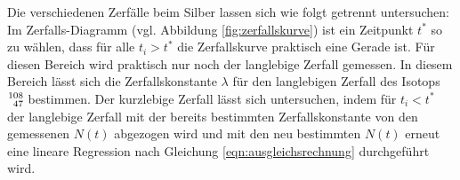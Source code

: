 Die verschiedenen Zerfälle beim Silber lassen sich wie folgt getrennt untersuchen:
Im Zerfalls-Diagramm (vgl. Abbildung \ref{fig:zerfallskurve}) ist ein Zeitpunkt $t^{*}$ so zu wählen, dass für alle $t_i>t^{*}$ die Zerfallskurve praktisch eine Gerade ist.
Für diesen Bereich wird praktisch nur noch der langlebige Zerfall gemessen.
In diesem Bereich lässt sich die Zerfallskonstante $\lambda$ für den langlebigen Zerfall des Isotops $\ce{^{108}_47}$ bestimmen.
Der kurzlebige Zerfall lässt sich untersuchen, indem für $t_i<t^{*}$ der langlebige Zerfall mit der bereits bestimmten Zerfallskonstante von den gemessenen $N(t)$ abgezogen wird und mit den neu bestimmten $N(t)$ erneut eine lineare Regression nach Gleichung \eqref{eqn:ausgleichsrechnung} durchgeführt wird.
